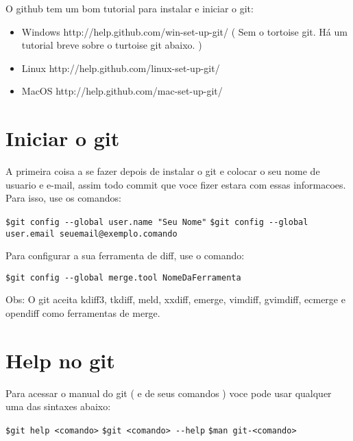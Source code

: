 \documentclass[12pt,onecolumn]{article}
\begin{document}
	O github tem um bom tutorial para instalar e iniciar o git:
	\begin{itemize}
    \item Windows   http://help.github.com/win-set-up-git/ ( Sem o tortoise git. Há um
                    tutorial breve sobre o turtoise git abaixo. )
    \item Linux     http://help.github.com/linux-set-up-git/
    \item MacOS     http://help.github.com/mac-set-up-git/
    \end{itemize}
    
\section{Iniciar o git}
    A primeira coisa a se fazer depois de instalar o git e colocar o seu nome de
usuario e e-mail, assim todo commit que voce fizer estara com essas informacoes.
Para isso, use os comandos:

\verb#$git config --global user.name "Seu Nome"#
\verb#$git config --global user.email seuemail@exemplo.comando#

    Para configurar a sua ferramenta de diff, use o comando:

\verb#$git config --global merge.tool NomeDaFerramenta#

Obs: O git aceita kdiff3, tkdiff, meld, xxdiff, emerge, vimdiff, gvimdiff, ecmerge
e opendiff como ferramentas de merge.

\section{Help no git}
    Para acessar o manual do git ( e de seus comandos ) voce pode usar qualquer
uma das sintaxes abaixo:

\verb#$git help <comando>#
\verb#$git <comando> --help#
\verb#$man git-<comando>#
\end{document}
